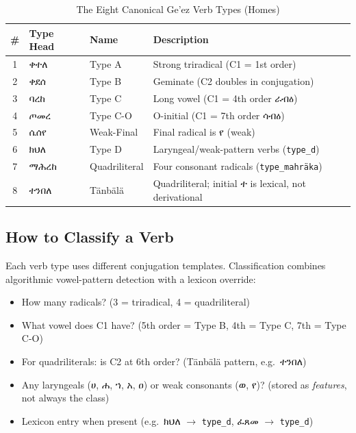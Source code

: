 \documentclass[conference]{IEEEtran}
\newcommand{\geez}[1]{{\ethiopicfont #1}}
\begin{document}
\begin{table}[h]
\centering
\caption{The Eight Canonical Ge'ez Verb Types (Homes)}
\begin{tabular}{clll}
\toprule
\# & Type Head & Name & Description \\
\midrule
1 & \geez{ቀተለ} & Type A & Strong triradical (C1 = 1st order) \\
2 & \geez{ቀደሰ} & Type B & Geminate (C2 doubles in conjugation) \\
3 & \geez{ባረከ} & Type C & Long vowel (C1 = 4th order \geez{ራብዕ}) \\
4 & \geez{ጦመረ} & Type C-O & O-initial (C1 = 7th order \geez{ሳብዕ}) \\
5 & \geez{ሴሰየ} & Weak-Final & Final radical is \geez{የ} (weak) \\
6 & \geez{ክህለ} & Type D & Laryngeal/weak-pattern verbs (\texttt{type\_d}) \\
7 & \geez{ማሕረከ} & Quadriliteral & Four consonant radicals (\texttt{type\_mahräka}) \\
8 & \geez{ተንበለ} & Tänbälä & Quadriliteral; initial \geez{ተ} is lexical, not derivational \\
\bottomrule
\end{tabular}
\label{tab:verb_homes}
\end{table}

\subsection{How to Classify a Verb}

Each verb type uses different conjugation templates. Classification combines algorithmic vowel-pattern detection with a lexicon override:

\begin{itemize}
    \item How many radicals? (3 = triradical, 4 = quadriliteral)
    \item What vowel does C1 have? (5th order = Type B, 4th = Type C, 7th = Type C-O)
    \item For quadriliterals: is C2 at 6th order? (Tänbälä pattern, e.g.\ \geez{ተንበለ})
    \item Any laryngeals (\geez{ሀ, ሐ, ኀ, አ, ዐ}) or weak consonants (\geez{ወ, የ})? (stored as \emph{features}, not always the class)
    \item Lexicon entry when present (e.g.\ \geez{ክህለ} $\rightarrow$ \texttt{type\_d}, \geez{ፈጸመ} $\rightarrow$ \texttt{type\_d})
\end{itemize}
\end{document}

